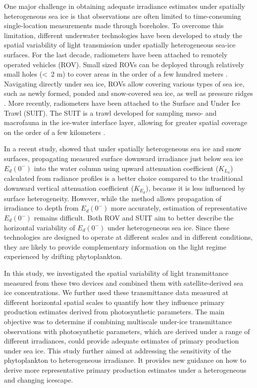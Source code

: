 \documentclass[draft]{agujournal2018}
\newcommand{\ked}{\ensuremath{K_{E_d}}}
\newcommand{\klu}{\ensuremath{K_{L_u}}}
\newcommand{\edzerominus}{\ensuremath{{E_d(0^-)}}}
\begin{document}
One major challenge in obtaining adequate irradiance estimates under spatially heterogeneous sea ice is that observations are often limited to time-consuming single-location measurements made through boreholes. To overcome this limitation, different underwater technologies have been developed to study the spatial variability of light transmission under spatially heterogeneous sea-ice surfaces. For the last decade, radiometers have been attached to remotely operated vehicles (ROV). Small sized ROVs can be deployed through relatively small holes (\textless~2 m) to cover areas in the order of a few hundred meters \citep{Katlein2015, Katlein2017, Ambrose2005, Lund-Hansen2018, Nicolaus2010}. Navigating directly under sea ice, ROVs allow covering various types of sea ice, such as newly formed, ponded and snow-covered sea ice, as well as pressure ridges \citep{Katlein2017}. More recently, radiometers have been attached to the Surface and Under Ice Trawl (SUIT). The SUIT is a trawl developed for sampling meso- and macrofauna in the ice-water interface layer, allowing for greater spatial coverage on the order of a few kilometers \citep{Flores2012, Lange2016, Lange2017}.

In a recent study, \citet{Massicotte2018} showed that under spatially heterogeneous sea ice and snow surfaces, propagating measured surface downward irradiance just below sea ice \edzerominus{} into the water column using upward attenuation coefficient (\klu{}) calculated from radiance profiles is a better choice compared to the traditional downward vertical attenuation coefficient (\ked{}), because it is less influenced by surface heterogeneity. However, while the method allows propagation of irradiance to depth from \edzerominus{} more accurately, estimation of representative \edzerominus{} remains difficult. Both ROV and SUIT aim to better describe the horizontal variability of \edzerominus{} under heterogeneous sea ice. Since these technologies are designed to operate at different scales and in different conditions, they are likely to provide complementary information on the light regime experienced by drifting phytoplankton.

In this study, we investigated the spatial variability of light transmittance measured from these two devices and combined them with satellite-derived sea ice concentrations. We further used these transmittance data measured at different horizontal spatial scales to quantify how they influence primary production estimates derived from photosynthetic parameters. The main objective was to determine if combining multiscale under-ice transmittance observations with photosynthetic parameters, which are derived under a range of different irradiances, could provide adequate  estimates of primary production under sea ice. This study further aimed at addressing the sensitivity of the phytoplankton to heterogeneous irradiance. It provides new guidance on how to derive more representative primary production estimates under a heterogeneous and changing icescape.
\end{document}
